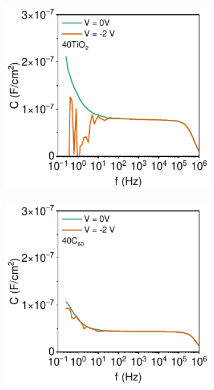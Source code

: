 \begin{figure}[htbp]
    \centering
    \begin{subfigure}{0.32\textwidth}
        \centering
        \includegraphics[width=\textwidth]{chapters/transport_layers/images/Cf_40TiO2.pdf}
        \caption{}
        \label{}
    \end{subfigure}
    \hfill
    \begin{subfigure}{0.32\textwidth}
        \centering
        \includegraphics[width=\textwidth]{chapters/transport_layers/images/Cf_40C60.pdf}

\end{subfigure}
\end{figure}
